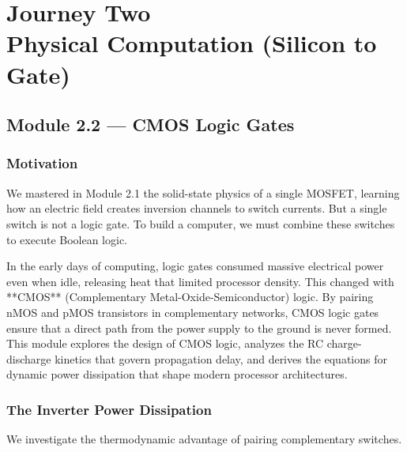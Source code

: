 \documentclass[12pt, a4paper]{book}
\begin{document}
\setcounter{chapter}{1}
\chapter[Journey 2 --- Physical Computation (Silicon to Gate)]
        {Journey Two\\[8pt]
         \textcolor{ModuleColor}{\large Physical Computation (Silicon to Gate)}}
\setcounter{section}{1}

\section{Module 2.2 --- CMOS Logic Gates}
\label{sec:mod2.2}

\subsection*{Motivation}

We mastered in Module 2.1 the solid-state physics of a single MOSFET, learning how an electric field creates inversion channels to switch currents.
But a single switch is not a logic gate.
To build a computer, we must combine these switches to execute Boolean logic.

In the early days of computing, logic gates consumed massive electrical power even when idle, releasing heat that limited processor density.
This changed with **CMOS** (Complementary Metal-Oxide-Semiconductor) logic.
By pairing nMOS and pMOS transistors in complementary networks, CMOS logic gates ensure that a direct path from the power supply to the ground is never formed.
This module explores the design of CMOS logic, analyzes the RC charge-discharge kinetics that govern propagation delay, and derives the equations for dynamic power dissipation that shape modern processor architectures.

\subsection{The Inverter Power Dissipation}

We investigate the thermodynamic advantage of pairing complementary switches.
\end{document}
